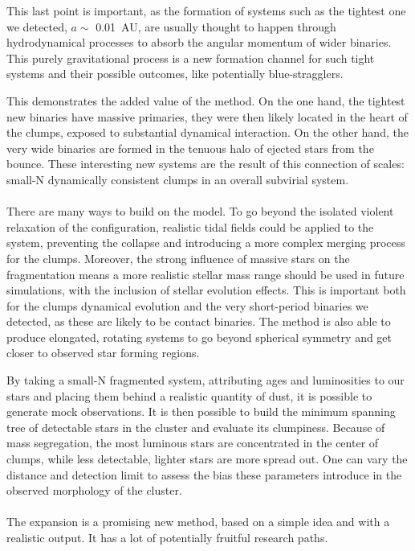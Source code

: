 This last point is important, as the formation of systems such as the tightest one we detected, $a \sim$ 0.01~AU, are usually thought to happen through hydrodynamical processes to absorb the angular momentum of wider binaries. This purely gravitational process is a new formation channel for such tight systems and their possible outcomes, like potentially blue-stragglers.

This demonstrates the added value of the \HubLem method. On the one hand, the tightest new binaries have massive primaries, they were then likely located in the heart of the clumps, exposed to substantial dynamical interaction. On the other hand, the very wide binaries are formed in the tenuous halo of ejected stars from the bounce. These interesting new systems are the result of this connection of scales: small-N dynamically consistent clumps in an overall subvirial system.


\paragraph*{}
There are many ways to build on the \HubLem model. To go beyond the isolated violent relaxation of the configuration, realistic tidal fields could be applied to the system, preventing the collapse and introducing a more complex merging process for the clumps. Moreover, the strong influence of massive stars on the fragmentation means a more realistic stellar mass range should be used in future simulations, with the inclusion of stellar evolution effects. This is important both for the clumps dynamical evolution and the very short-period binaries we detected, as these are likely to be contact binaries. The \HubLem method is also able to produce elongated, rotating systems to go beyond spherical symmetry and get closer to observed star forming regions.

By taking a small-N fragmented system, attributing ages and luminosities to our stars and placing them behind a realistic quantity of dust, it is possible to generate mock observations. It is then possible to build the minimum spanning tree of detectable stars in the cluster and evaluate its clumpiness. Because of mass segregation, the most luminous stars are concentrated in the center of clumps, while less detectable, lighter stars are more spread out. One can vary the distance and detection limit to assess the bias these parameters introduce in the observed morphology of the cluster.


\paragraph*{}
The \HubLem expansion is a promising new method, based on a simple idea and with a realistic output. It has a lot of potentially fruitful research paths.


